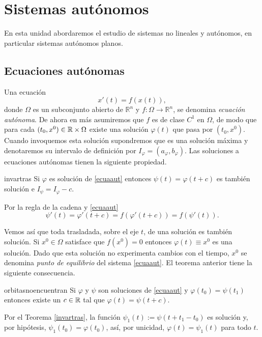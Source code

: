 \chapter{Sistemas autónomos}


En esta unidad abordaremos el estudio de  sistemas no lineales y
autónomos, en particular sistemas autónomos planos.
\section{Ecuaciones autónomas}

Una ecuación
\begin{equation}\label{ecuaaut}
    x'(t)=f(x(t)),
\end{equation}
donde $\Omega$ es un subconjunto abierto de $\mathbb{R}^n$ y $
f:\Omega\to\mathbb{R}^n$, se denomina \emph{ecuación autónoma}. De
ahora en más asumiremos que $f$ es de clase $C^1$ en $\Omega$, de
modo que para cada $(t_0,x^0)\in\mathbb{R}\times\Omega$ existe una
solución $\varphi(t)$ que pasa por $(t_0,x^0)$. Cuando invoquemos
esta solución supondremos que es una solución máxima y denotaremos
su intervalo de definición por
$I_{\varphi}=(a_{\varphi},b_{\varphi})$. Las soluciones a
ecuaciones autónomas tienen la siguiente  propiedad.

\begin{teorema}{invartras} Si $\varphi$ es solución de \eqref{ecuaaut}
entonces $\psi(t)=\varphi(t+c)$ es también solución e
$I_{\psi}=I_{\varphi}-c$.
\end{teorema}
\begin{demo} Por la regla de la cadena y \eqref{ecuaaut}
\[
    \psi'(t)=\varphi'(t+c)=f(\varphi'(t+c))=f(\psi'(t)).
\]
\end{demo}
Vemos así que toda trasladada, sobre el eje $t$, de una solución
es también solución. Si $x^0\in\Omega$ satisface que $f(x^0)=0$
entonces $\varphi(t)\equiv x^0$ es una solución. Dado que esta solución
no experimenta cambios con el tiempo, $x^0$ se denomina
\emph{punto de equilibrio} del sistema \eqref{ecuaaut}. El teorema
anterior tiene la siguiente consecuencia.

\begin{teorema}{orbitasnoencuentran} Si $\varphi$ y $\psi$ son soluciones de
\eqref{ecuaaut} y $\varphi(t_0)=\psi(t_1)$ entonces existe un $c\in\mathbb{R}$
tal que $\varphi(t)=\psi(t+c)$.
\end{teorema}
\begin{demo} Por el Teorema \ref{invartras}, la función
$\psi_1(t):=\psi(t+t_1-t_0)$ es solución y, por hipótesis,
$\psi_1(t_0)=\varphi(t_0)$, así, por unicidad, $\varphi(t)=\psi_1(t)$ para
todo $t$. \end{demo}

